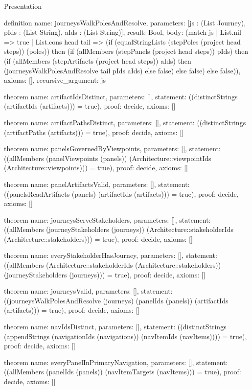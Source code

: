 \begin{lexlean}{Presentation}
\begin{semanticmodule}
definition{
  name: journeysWalkPolesAndResolve,
  parameters: [js : (List Journey), pIds : (List String), aIds : (List String)],
  result: Bool,
  body: (match js
    | List.nil => true
    | List.cons head tail => (if (equalStringLists (stepPoles (project head steps)) (poles)) then (if (allMembers (stepPanels (project head steps)) pIds) then (if (allMembers (stepArtifacts (project head steps)) aIds) then (journeysWalkPolesAndResolve tail pIds aIds) else false) else false) else false)),
  axioms: [],
  recursive_argument: js
}

theorem{
  name: artifactIdsDistinct,
  parameters: [],
  statement: ((distinctStrings (artifactIds (artifacts))) = true),
  proof: decide{},
  axioms: []
}

theorem{
  name: artifactPathsDistinct,
  parameters: [],
  statement: ((distinctStrings (artifactPaths (artifacts))) = true),
  proof: decide{},
  axioms: []
}

theorem{
  name: panelsGovernedByViewpoints,
  parameters: [],
  statement: ((allMembers (panelViewpoints (panels)) (Architecture::viewpointIds (Architecture::viewpoints))) = true),
  proof: decide{},
  axioms: []
}

theorem{
  name: panelArtifactsValid,
  parameters: [],
  statement: ((panelsReadArtifacts (panels) (artifactIds (artifacts))) = true),
  proof: decide{},
  axioms: []
}

theorem{
  name: journeysServeStakeholders,
  parameters: [],
  statement: ((allMembers (journeyStakeholders (journeys)) (Architecture::stakeholderIds (Architecture::stakeholders))) = true),
  proof: decide{},
  axioms: []
}

theorem{
  name: everyStakeholderHasJourney,
  parameters: [],
  statement: ((allMembers (Architecture::stakeholderIds (Architecture::stakeholders)) (journeyStakeholders (journeys))) = true),
  proof: decide{},
  axioms: []
}

theorem{
  name: journeysValid,
  parameters: [],
  statement: ((journeysWalkPolesAndResolve (journeys) (panelIds (panels)) (artifactIds (artifacts))) = true),
  proof: decide{},
  axioms: []
}

theorem{
  name: navIdsDistinct,
  parameters: [],
  statement: ((distinctStrings (appendStrings (navigationIds (navigations)) (navItemIds (navItems)))) = true),
  proof: decide{},
  axioms: []
}

theorem{
  name: everyPanelInPrimaryNavigation,
  parameters: [],
  statement: ((allMembers (panelIds (panels)) (navItemTargets (navItems))) = true),
  proof: decide{},
  axioms: []
}


\end{semanticmodule}
\end{lexlean}
